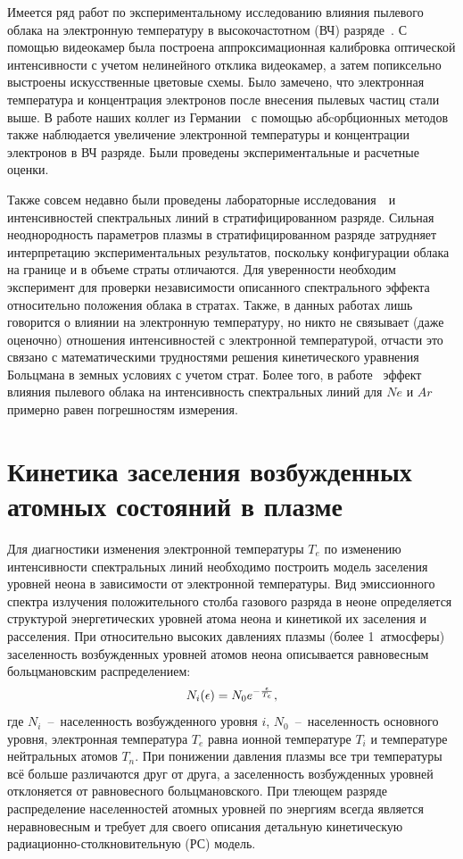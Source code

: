 Имеется ряд работ по экспериментальному исследованию влияния пылевого облака на электронную температуру в
высокочастотном (ВЧ) разряде~\cite{Samsonov1999}. С помощью видеокамер была построена аппроксимационная калибровка
оптической интенсивности с учетом нелинейного отклика видеокамер, а затем попиксельно выстроены искусственные
цветовые схемы. Было замечено, что электронная температура и концентрация электронов после внесения пылевых частиц стали выше.
В работе наших коллег из Германии~\cite{Mitic2009} с помощью абcорбционных методов также наблюдается увеличение
электронной температуры и концентрации электронов в ВЧ разряде. Были проведены экспериментальные и расчетные оценки.

Также совсем недавно были проведены лабораторные исследования~\cite{Pikalev2018}~и~\cite{Kostenko} интенсивностей спектральных линий
в стратифицированном разряде. Сильная неоднородность параметров плазмы в стратифицированном разряде затрудняет интерпретацию
экспериментальных результатов, поскольку конфигурации облака на границе и в объеме страты отличаются.
Для уверенности необходим эксперимент для проверки независимости описанного спектрального эффекта относительно положения облака в стратах.
Также, в данных работах лишь говорится о влиянии на электронную температуру, но никто
не связывает (даже оценочно) отношения интенсивностей с электронной температурой, отчасти это связано с математическими
трудностями решения кинетического уравнения Больцмана в земных условиях с учетом страт.
Более того, в работе~\cite{Pikalev2018} эффект влияния пылевого облака на
интенсивность спектральных линий для $Ne$ и $Ar$ примерно равен погрешностям измерения.

\section{Кинетика заселения возбужденных атомных состояний в плазме}
\label{sec:kinetika}
Для диагностики изменения электронной температуры $T_e$ по изменению
интенсивности спектральных линий необходимо построить модель заселения уровней
неона в зависимости от электронной температуры. Вид эмиссионного спектра
излучения положительного столба газового разряда в неоне определяется
структурой энергетических уровней атома неона и кинетикой их заселения и
расселения. При относительно высоких давлениях плазмы (более 1~атмосферы) заселенность
возбужденных уровней атомов неона описывается равновесным больцмановским
распределением:
\begin{equation}
    N_i(\epsilon) = N_0 e^{- {\epsilon \over T_e}},
\end{equation}
где $N_i$~--~населенность возбужденного уровня $i$, $N_0$~--~населенность основного уровня,
электронная температура $T_e$ равна ионной температуре $T_i$ и температуре
нейтральных атомов $T_n$. При понижении давления плазмы все три температуры всё
больше различаются друг от друга, а заселенность возбужденных уровней
отклоняется от равновесного больцмановского. При тлеющем разряде распределение населенностей атомных уровней по
энергиям всегда является неравновесным и требует для своего описания детальную
кинетическую радиационно-столкновительную (РС) модель.

